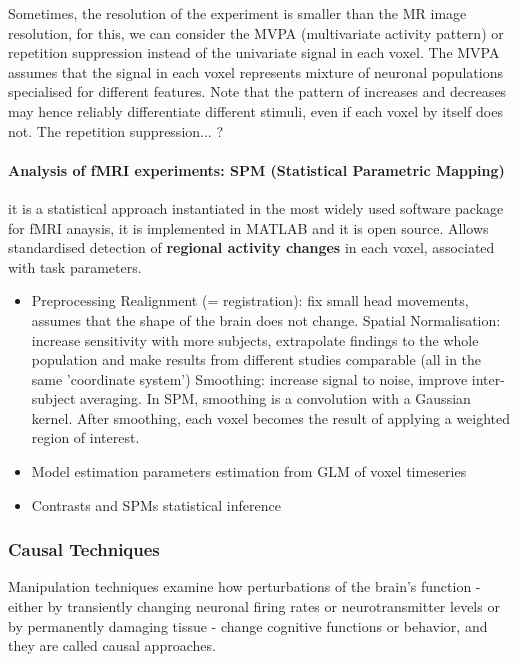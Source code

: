 \documentclass[12pt,article,oneside,a4paper]{memoir}
\begin{document}
Sometimes, the resolution of the experiment is smaller than the MR image resolution, for this, we can consider the MVPA (multivariate activity pattern) or repetition suppression instead of the univariate signal in each voxel. The MVPA assumes that the signal in each voxel represents mixture of neuronal populations specialised for different features. Note that the pattern of increases and decreases may hence reliably differentiate different stimuli, even if each voxel by itself does not. The repetition suppression... ?

\paragraph{ Analysis of fMRI experiments: SPM (Statistical Parametric Mapping) } it is a statistical approach instantiated in the most widely used software package for fMRI anaysis, it is implemented in MATLAB and it is open source. Allows standardised detection of \textbf{regional activity changes} in each voxel, associated with task parameters.

\begin{itemize}
\item Preprocessing
\subitem Realignment (= registration): fix small head movements, assumes that the shape of the brain does not change.
\subitem Spatial Normalisation: increase sensitivity with more subjects, extrapolate findings to the whole population and make results from different studies comparable (all in the same 'coordinate system')
\subitem Smoothing: increase signal to noise, improve inter-subject averaging. In SPM, smoothing is a convolution with a Gaussian kernel. After smoothing, each voxel becomes the result of applying a weighted region of interest.
\item Model estimation
\subitem parameters estimation from GLM of voxel timeseries
\item Contrasts and SPMs
\subitem statistical inference
\end{itemize}


\subsubsection{Causal Techniques}
Manipulation techniques examine how perturbations of the brain’s function - either by
transiently changing neuronal firing rates or neurotransmitter levels or by permanently damaging tissue - change cognitive functions or behavior, and they are called causal approaches.
\end{document}
